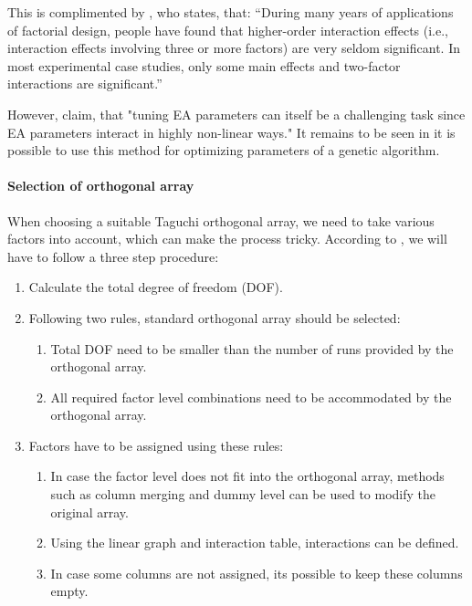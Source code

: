 This is complimented by \cite{yang_design_2009}, who states, that:
\enquote{During many years of applications of factorial design, people have found that higher-order interaction effects (i.e., interaction effects involving three or more factors) are very seldom significant. In most experimental case studies, only some main effects and two-factor interactions are significant.}


However, \cite{kacprzyk_parameter_2007} claim, that "tuning EA parameters can itself be a challenging task since EA parameters interact in highly non-linear ways." It remains to be seen in it is possible to use this method for optimizing parameters of a genetic algorithm.

\paragraph{Selection of orthogonal array}
When choosing a suitable Taguchi orthogonal array, we need to take various factors into account, which can make the process tricky. According to \cite{yang_design_2009}, we will have to follow a three step procedure:

\begin{enumerate}
	\item Calculate the total degree of freedom (DOF). 
	\item Following two rules, standard orthogonal array should be selected:
	\begin{enumerate}
		\item Total DOF need to be smaller than the number of runs provided by the orthogonal array.
		\item All required factor level combinations need to be accommodated by the orthogonal array.
	\end{enumerate}
	
	\item Factors have to be assigned using these rules: 
	\begin{enumerate}
		\item In case the factor level does not fit into the orthogonal array, methods such as column merging and dummy level can be used to modify the original array.
		\item Using the linear graph and interaction table, interactions can be defined. 
		\item In case some columns are not assigned, its possible to keep these columns empty.
	\end{enumerate}
\end{enumerate}


